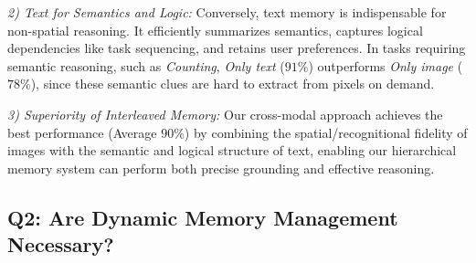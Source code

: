 \textit{2) Text for Semantics and Logic:}
Conversely, text memory is indispensable for non-spatial reasoning. It efficiently summarizes semantics, captures logical dependencies like task sequencing, and retains user preferences. 
In tasks requiring semantic reasoning, such as \textit{Counting}, \textit{Only text} ($91\%$) outperforms \textit{Only image} ($78\%$), since these semantic clues are hard to extract from pixels on demand.


\textit{3) Superiority of Interleaved Memory:}
Our cross-modal approach achieves the best performance (Average $90\%$) by combining the spatial/recognitional fidelity of images with the semantic and logical structure of text, enabling our hierarchical memory system can perform both precise grounding and effective reasoning.



\subsection{Q2: Are Dynamic Memory Management Necessary?}


